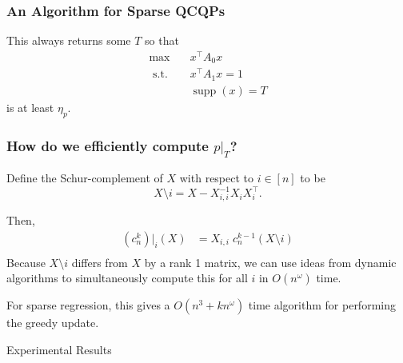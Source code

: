 \documentclass{beamer}
\DeclareMathOperator*{\supp}{supp}
\newcommand{\st}{{\text{ s.t. }}}
\begin{document}
\begin{frame}
    \frametitle{An Algorithm for Sparse QCQPs}
    
This always returns some $T$ so that 
\begin{equation*}
    \begin{aligned}
        \max\quad & x^{\intercal}A_0x\\
        \st & x^{\intercal}A_1x = 1\\
            & \supp(x) = T
    \end{aligned}
\end{equation*}
is at least $\eta_p$.
\end{frame}
\begin{frame}
    \frametitle{How do we efficiently compute $p|_T$?}
    Define the Schur-complement of $X$ with respect to $i \in [n]$ to be
    \[
        X \setminus i = X - X_{i,i}^{-1} X_{i} X_{i}^{\intercal}.
    \]

    Then,
    \begin{align*} 
        (c_n^k)|_i(X)&=X_{i,i} \; c_n^{k-1}(X \setminus i)\\
    \end{align*}
    Because $X \setminus i$ differs from $X$ by a rank 1 matrix, we can use ideas from dynamic algorithms to simultaneously compute this for all $i$ in $O(n^{\omega})$ time.

    For sparse regression, this gives a $O(n^3+kn^{\omega})$ time algorithm for performing the greedy update.
\end{frame}
\begin{frame}
    \centering
    \huge
    {\color{gray}Experimental Results}
\end{frame}
\end{document}

